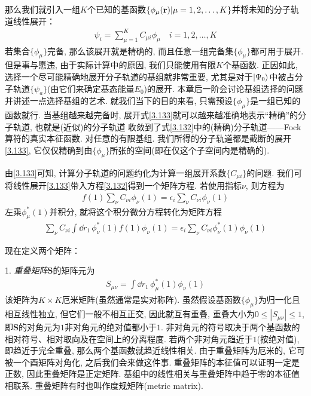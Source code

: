 那么我们就引入一组$K$个已知的基函数$\{\phi_\mu(\mathbf{r})|\mu=1,2,\ldots,K\}$并将未知的分子轨道线性展开：
\begin{align}
\label{3.133}
\psi_i = \sum_{\mu=1}^{K}C_{\mu i}\phi_\mu\quad i = 1,2,\ldots,K
\end{align}
若集合$\{\phi_\mu\}$完备, 那么该展开就是精确的, 而且任意一组完备集$\{\phi_\mu\}$都可用于展开. 但是事与愿违, 由于实际计算中的原因, 我们只能使用有限$K$个基函数. 正因如此, 选择一个尽可能精确地展开分子轨道的基组就非常重要, 尤其是对于$\Ket{\Psi_0}$中被占分子轨道$\{\psi_a\}$(由它们来确定基态能量$E_0$)的展开. 本章后一阶会讨论基组选择的问题并讲述一点选择基组的艺术. 就我们当下的目的来看, 只需预设$\{\phi_\mu\}$是一组已知的函数就行. 当基组越来越完备时, 展开式\eqref{3.133}就可以越来越准确地表示“精确”的分子轨道, 也就是(近似)的分子轨道 收敛到了式\eqref{3.132}中的(精确)分子轨道——Fock算符的真实本征函数. 对任意的有限基组. 我们所得的分子轨道都是截断的展开\eqref{3.133}, 它仅仅精确到由$\{\phi_\mu\}$所张的空间(即在仅这个子空间内是精确的).

由\eqref{3.133}可知, 计算\hft 分子轨道的问题约化为计算一组展开系数$\{C_{\mu i} \}$的问题. 我们可将线性展开\eqref{3.133}带入\hft 方程\eqref{3.132}得到一个矩阵方程. 若使用指标$\nu$, 则方程为
\begin{align}
f(1) \sum_\nu C_{\nu i}\phi_\nu(1) = \epsilon_i\sum_\nu C_{\nu i}\phi_\nu(1) 
\end{align}
左乘$\phi_\mu^*(1)$并积分, 就将这个积分微分方程转化为矩阵方程
\begin{align}
\label{3.135}
\sum_\nu C_{\nu i}\int\dd{r}_1\,\phi_\nu^*(1)f(1)\phi_\nu(1) = \epsilon_i\sum_\nu C_{\nu i}\phi_\nu^*(1)\phi_\nu(1)
\end{align}

现在定义两个矩阵：

1. \emph{重叠矩阵$\mathbf{S}$}的矩阵元为
\begin{align}
S_{\mu\nu}=\int\dd{r}_1\,\phi_\mu^*(1)\phi_\nu(1)
\end{align}
该矩阵为$K\times K$厄米矩阵(虽然通常是实对称阵). 虽然假设基函数$\{\phi_\mu\}$为归一化且相互线性独立, 但它们一般不相互正交, 因此就互有重叠, 重叠大小为$0\leqslant|S_{\mu\nu}|\leqslant1$, 即$\mathbf{S}$的对角元为$1$非对角元的绝对值都小于$1$. 非对角元的符号取决于两个基函数的相对符号、相对取向及在空间上的分离程度. 若两个非对角元趋近于$1$(按绝对值), 即趋近于完全重叠, 那么两个基函数就趋近线性相关. 由于重叠矩阵为厄米的, 它可被一个酉矩阵对角化, 之后我们会来做这件事. 重叠矩阵的本征值可以证明一定是正数, 因此重叠矩阵是正定矩阵. 基组中的线性相关与重叠矩阵中趋于零的本征值相联系. 重叠矩阵有时也叫作度规矩阵(metric matrix).  

